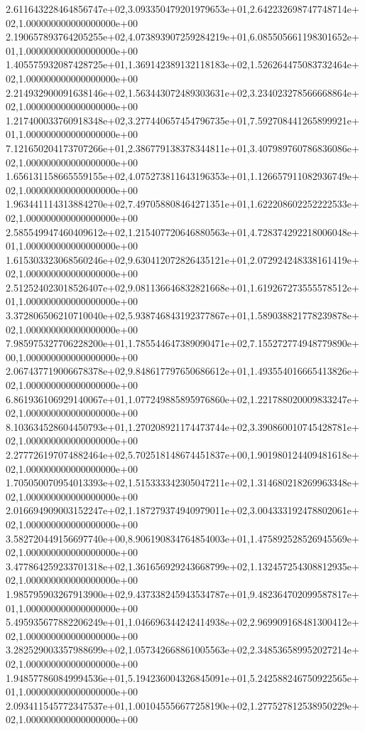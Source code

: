 2.611643228464856747e+02,3.093350479201979653e+01,2.642232698747748714e+02,1.000000000000000000e+00
2.190657893764205255e+02,4.073893907259284219e+01,6.085505661198301652e+01,1.000000000000000000e+00
1.405575932087428725e+01,1.369142389132118183e+02,1.526264475083732464e+02,1.000000000000000000e+00
2.214932900091638146e+02,1.563443072489303631e+02,3.234023278566668864e+02,1.000000000000000000e+00
1.217400033760918348e+02,3.277440657454796735e+01,7.592708441265899921e+01,1.000000000000000000e+00
7.121650204173707266e+01,2.386779138378344811e+01,3.407989760786836086e+02,1.000000000000000000e+00
1.656131158665559155e+02,4.075273811643196353e+01,1.126657911082936749e+02,1.000000000000000000e+00
1.963441114313884270e+02,7.497058808464271351e+01,1.622208602252222533e+02,1.000000000000000000e+00
2.585549947460409612e+02,1.215407720646880563e+01,4.728374292218006048e+01,1.000000000000000000e+00
1.615303323068560246e+02,9.630412072826435121e+01,2.072924248338161419e+02,1.000000000000000000e+00
2.512524023018526407e+02,9.081136646832821668e+01,1.619267273555578512e+01,1.000000000000000000e+00
3.372806506210710040e+02,5.938746843192377867e+01,1.589038821778239878e+02,1.000000000000000000e+00
7.985975327706228200e+01,1.785544647389090471e+02,7.155272774948779890e+00,1.000000000000000000e+00
2.067437719006678378e+02,9.848617797650686612e+01,1.493554016665413826e+02,1.000000000000000000e+00
6.861936106929140067e+01,1.077249885895976860e+02,1.221788020009833247e+02,1.000000000000000000e+00
8.103634528604450793e+01,1.270208921174473744e+02,3.390860010745428781e+02,1.000000000000000000e+00
2.277726197074882464e+02,5.702518148674451837e+00,1.901980124409481618e+02,1.000000000000000000e+00
1.705050070954013393e+02,1.515333342305047211e+02,1.314680218269963348e+02,1.000000000000000000e+00
2.016694909003152247e+02,1.187279374940979011e+02,3.004333192478802061e+02,1.000000000000000000e+00
3.582720449156697740e+00,8.906190834764854003e+01,1.475892528526945569e+02,1.000000000000000000e+00
3.477864259233701318e+02,1.361656929243668799e+02,1.132457254308812935e+02,1.000000000000000000e+00
1.985795903267913900e+02,9.437338245943534787e+01,9.482364702099587817e+01,1.000000000000000000e+00
5.495935677882206249e+01,1.046696344242414938e+02,2.969909168481300412e+02,1.000000000000000000e+00
3.282529003357988699e+02,1.057342668861005563e+02,2.348536589952027214e+02,1.000000000000000000e+00
1.948577860849994536e+01,5.194236004326845091e+01,5.242588246750922565e+01,1.000000000000000000e+00
2.093411545772347537e+01,1.001045556677258190e+02,1.277527812538950229e+02,1.000000000000000000e+00

